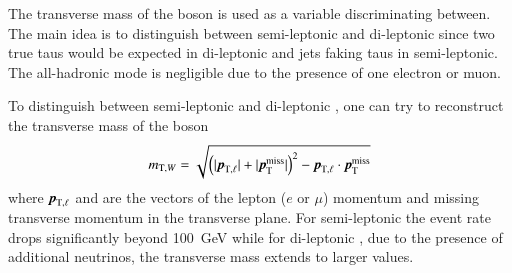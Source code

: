 The transverse mass of the \PW boson is used as a variable
discriminating between. The main idea is to distinguish between
semi-leptonic and di-leptonic \ttbar since two true taus would be
expected in di-leptonic and jets faking taus in semi-leptonic. The
all-hadronic mode is negligible due to the presence of one electron or
muon.

To distinguish between semi-leptonic and di-leptonic \ttbar, one can try to reconstruct the transverse mass of the \PW boson
\begin{align*}
  \mTW = \sqrt{\left( | \myvec{p}_{\text{T}, \ell} | + | \pTmiss | \right)^2
               - \myvec{p}_{\text{T}, \ell} \cdot \pTmiss}
\end{align*}
where $\myvec{p}_{\text{T}, \ell}$ and \pTmiss are the vectors of the
lepton ($e$ or $\mu$) momentum and missing transverse momentum in the
transverse plane. For semi-leptonic \ttbar the event rate drops
significantly beyond \SI{100}{\GeV} while for di-leptonic \ttbar, due
to the presence of additional neutrinos, the transverse mass extends
to larger values.

